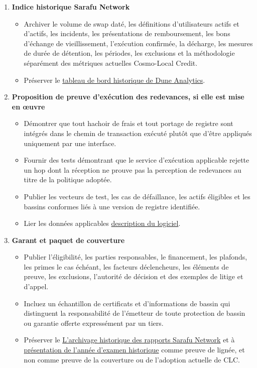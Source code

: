 \documentclass[11pt]{article}
\begin{document}
\begin{enumerate}[leftmargin=*]
\item \textbf{Indice historique Sarafu Network}
\begin{itemize}[leftmargin=*]
\item Archiver le volume de swap daté, les définitions d'utilisateurs actifs et d'actifs, les incidents, les présentations de remboursement, les bons d'échange de vieillissement, l'exécution confirmée, la décharge, les mesures de durée de détention, les périodes, les exclusions et la méthodologie séparément des métriques actuelles Cosmo-Local Credit.
\item Préserver le \href{https://dune.com/grassrootseconomics/sarafu-network}{tableau de bord historique de Dune Analytics}.
\end{itemize}
\item \textbf{Proposition de preuve d'exécution des redevances, si elle est mise en œuvre}
\begin{itemize}[leftmargin=*]
\item Démontrer que tout hachoir de frais et tout portage de registre sont intégrés dans le chemin de transaction exécuté plutôt que d'être appliqués uniquement par une interface.
\item Fournir des tests démontrant que le service d'exécution applicable rejette un hop dont la réception ne prouve pas la perception de redevances au titre de la politique adoptée.
\item Publier les vecteurs de test, les cas de défaillance, les actifs éligibles et les bassins conformes liés à une version de registre identifiée.
\item Lier les données applicables \href{https://software.grassecon.org}{description du logiciel}.
\end{itemize}
\item \textbf{Garant et paquet de couverture}
\begin{itemize}[leftmargin=*]
\item Publier l'éligibilité, les parties responsables, le financement, les plafonds, les primes le cas échéant, les facteurs déclencheurs, les éléments de preuve, les exclusions, l'autorité de décision et des exemples de litige et d'appel.
\item Incluez un échantillon de certificats et d'informations de bassin qui distinguent la responsabilité de l'émetteur de toute protection de bassin ou garantie offerte expressément par un tiers.
\item Préserver le \href{https://sarafu.network/reports}{L'archivage historique des rapports Sarafu Network} et à \href{https://youtu.be/5yGaP31bvs0?si=fZ-AMTEXsmVR8Ulv}{présentation de l'année d'examen historique} comme preuve de lignée, et non comme preuve de la couverture ou de l'adoption actuelle de CLC.

\end{itemize}
\end{enumerate}
\end{document}
